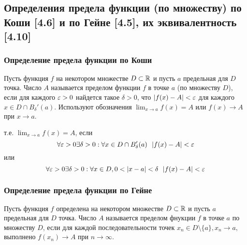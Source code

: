 \documentclass[12pt, a4paper]{article}
\begin{document}
\subsection{Определения предела функции (по множеству) по Коши [4.6] и по Гейне [4.5], их эквивалентность [4.10]}
\subsubsection{Определение предела функции по Коши}
Пусть функция $f$ на некотором множестве $D \subset \mathbb{R}$ и пусть $a$ предельная для $D$ точка. Число $A$ называется пределом функции $f$ в точке $a$ (по множеству $D$), если для каждого $\varepsilon > 0$ найдется такое $\delta > 0$, что $|f(x) - A| < \varepsilon$ для каждого $x \in D \cap B_{\delta}'(a)$. Используют обозначения $\lim_{x \to a} f(x) = A$ или $f(x) \to A$ при $x \to a$.

    т.е. $\lim_{x \to a} f(x)= A$, если 
    \begin{equation*}
        \forall \varepsilon > 0 \exists \delta > 0 : \forall x \in D \cap B_{\delta}'(a) \ \ |f(x) - A| < \varepsilon
    \end{equation*}
    или
    \begin{equation*}
        \forall \eps > 0 \exists \delta > 0 : \forall x \in D, 0 < |x - a| < \delta \ \ |f(x) - A| < \eps
    \end{equation*}
    \subsubsection{Определение предела функции по Гейне}
    Пусть функция $f$ определена на некотором множестве $D \subset \mathbb{R}$ и пусть $a$ предельная для $D$ точка. Число $A$ называется пределом фнукции $f$ в точке $a$ по множеству $D$, если для каждой последовательности точек $x_n \in D \setminus \{a\}, x_n \to a,$ выполнено $f(x_n) \to A$ при $n \to \infty$.
\end{document}
